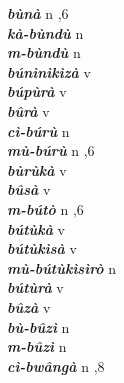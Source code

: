 \begin{multicols}{2}
{{\bfseries\itshape bùnà}} \relax  n  ,6  \relax   \relax  \\
{{\bfseries\itshape kà-bùndù}} \relax  n   \relax  {} \relax   \relax  \\
{{\bfseries\itshape m-bùndù}} \relax  n   \relax  {} \relax   \relax  \\
{{\bfseries\itshape búnìnìkìzà}} \relax  v  \relax   \relax  {} \relax   \relax  \\
{{\bfseries\itshape búpùrà}} \relax  v  \relax   \relax  {} \relax   \relax  \\
{{\bfseries\itshape bûrà}} \relax  v  \relax   \relax  {} \relax   \relax  \\
{{\bfseries\itshape cì-búrù}} \relax  n   \relax  {} \relax   \relax  \\
{{\bfseries\itshape mù-búrù}} \relax  n  ,6  \relax   \relax  \\
{{\bfseries\itshape bùrùkà}} \relax  v  \relax   \relax  {} \relax   \relax  \\
{{\bfseries\itshape bûsà}} \relax  v  \relax  {} \relax   \relax  \\
{{\bfseries\itshape m-bútò}} \relax  n  ,6  \relax   \relax  \\
{{\bfseries\itshape bútùkà}} \relax  v  \relax   \relax  {} \relax   \relax  \\
{{\bfseries\itshape bútùkìsà}} \relax  v  \relax   \relax  {} \relax   \relax  \\
{{\bfseries\itshape mù-bútùkìsìrò}} \relax  n   \relax  {} \relax   \relax  \\
{{\bfseries\itshape bútùrà}} \relax  v  \relax   \relax  {} \relax   \relax  \\
{{\bfseries\itshape bûzà}} \relax  v  \relax   \relax  {} \relax   \relax  \\
{{\bfseries\itshape bù-bûzì}} \relax  n  \relax   \relax  {} \relax   \relax  \\
{{\bfseries\itshape m-bûzì}} \relax  n   \relax  {} \relax   \relax  \\
{{\bfseries\itshape cì-bwângà}} \relax  n  ,8  \relax   \relax  \\

\end{multicols}
